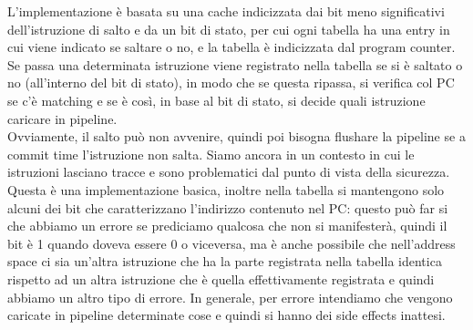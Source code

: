 \documentclass[14pt, oneside]{book}
\begin{document}
L'implementazione è basata su una cache indicizzata dai bit meno significativi dell'istruzione di salto e da un bit di stato, per cui ogni tabella ha una entry in cui viene indicato se saltare o no, e la tabella è indicizzata dal program counter. \\ Se passa una determinata istruzione viene registrato nella tabella se si è saltato o no (all'interno del bit di stato), in modo che se questa ripassa, si verifica col PC se c'è matching e se è così, in base al bit di stato, si decide quali istruzione caricare in pipeline.\\ Ovviamente, il salto può non avvenire, quindi poi bisogna flushare la pipeline se a commit time l'istruzione non salta. Siamo ancora in un contesto in cui le istruzioni lasciano tracce e sono problematici dal punto di vista della sicurezza.\\ Questa è una implementazione basica, inoltre nella tabella si mantengono solo alcuni dei bit che caratterizzano l'indirizzo contenuto nel PC: questo può far si che abbiamo un errore se prediciamo qualcosa che non si manifesterà, quindi il bit è 1 quando doveva essere 0 o viceversa, ma è anche possibile che nell'address space ci sia un'altra istruzione che ha la parte registrata nella tabella identica rispetto ad un altra istruzione che è quella effettivamente registrata e quindi abbiamo un altro tipo di errore. In generale, per errore intendiamo che vengono caricate in pipeline determinate cose e quindi si hanno dei side effects inattesi.
\end{document}
